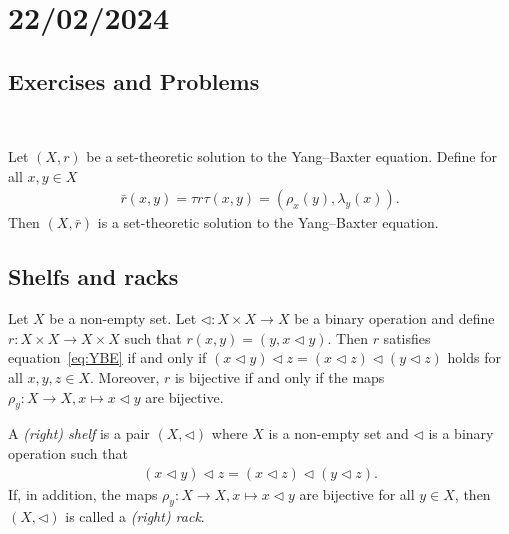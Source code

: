 \section{22/02/2024}


\subsection{Exercises and Problems}\mbox{ }


\begin{exercise}\label{ex:taurtau}
    Let $(X,r)$ be a set-theoretic solution to the Yang--Baxter equation. Define for all $x,y \in X$
    \begin{align*}
        \bar{r}(x,y) = \tau r \tau (x,y) = (\rho_x(y),\lambda_y(x)).
    \end{align*}
    Then $(X,\bar{r})$ is a set-theoretic solution to the Yang--Baxter equation.
\end{exercise}


\subsection{Shelfs and racks}\mbox{}
    
    \begin{exercise}\label{ex2}
         Let $X$ be a non-empty set.
         Let $\triangleleft: X\times X \to X$ be a binary operation and define $r: X\times X \to X\times X$ such that $r(x,y)= (y,x \triangleleft y)$. Then $r$ satisfies equation~\ref{eq:YBE} if and only if $(x\triangleleft y)\triangleleft z=(x\triangleleft z)\triangleleft(y\triangleleft z)$ holds for all $x,y,z \in X$. 
         Moreover, $r$ is bijective if and only if the maps $\rho_y:X\to X, x \mapsto x\triangleleft y$ are bijective.
    \end{exercise}

    \begin{definition}
         A \emph{(right) shelf} is a pair $(X,\triangleleft)$ where $X$ is a non-empty set and $\triangleleft$ is a binary operation such that 
        \begin{align*}
            (x\triangleleft y)\triangleleft z=(x\triangleleft z)\triangleleft(y\triangleleft z).
        \end{align*}
        If, in addition, the maps $\rho_y:X \to X, x \mapsto x\triangleleft y$ are bijective for all $y\in X$, then $(X,\triangleleft)$ is called a \emph{(right) rack}.
    \end{definition}

